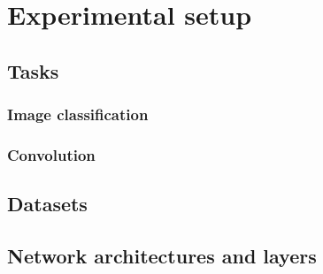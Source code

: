 \chapter{Experimental setup}

\section{Tasks}

\subsection{Image classification}

\subsection{Convolution}

\section{Datasets}

\section{Network architectures and layers}    